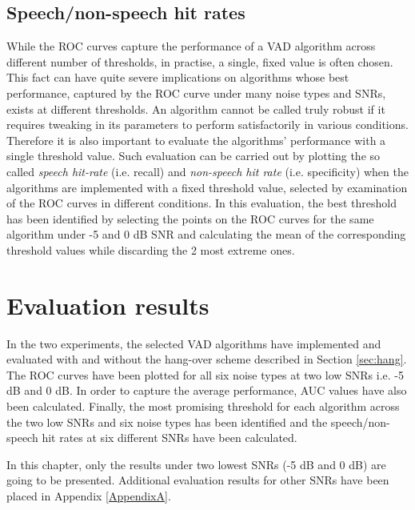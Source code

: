 \subsection{Speech/non-speech hit rates}

While the ROC curves capture the performance of a VAD algorithm across different number of thresholds, in practise, a single, fixed value is often chosen. This fact can have quite severe implications on algorithms whose best performance, captured by the ROC curve under many noise types and SNRs, exists at different thresholds. An algorithm cannot be called truly robust if it requires tweaking in its parameters to perform satisfactorily in various conditions. Therefore it is also important to evaluate the algorithms' performance with a single threshold value. Such evaluation can be carried out by plotting the so called \emph{speech hit-rate} (i.e. recall) and \emph{non-speech hit rate} (i.e. specificity) when the algorithms are implemented with a fixed threshold value, selected by examination of the ROC curves in different conditions. In this evaluation, the best threshold has been identified by selecting the points on the ROC curves for the same algorithm under -5 and 0 dB SNR and calculating the mean of the corresponding threshold values while discarding the 2 most extreme ones.


\section{Evaluation results}

In the two experiments, the selected VAD algorithms have implemented and evaluated with and without the hang-over scheme described in Section \ref{sec:hang}. The ROC curves have been plotted for all six noise types at two low SNRs i.e. -5 dB and 0 dB. In order to capture the average performance, AUC values have also been calculated. Finally, the most promising threshold for each algorithm across the two low SNRs and six noise types has been identified and the speech/non-speech hit rates at six different SNRs have been calculated.

In this chapter, only the results under two lowest SNRs (-5 dB and 0 dB) are going to be presented. Additional evaluation results for other SNRs have been placed in Appendix \ref{AppendixA}.

